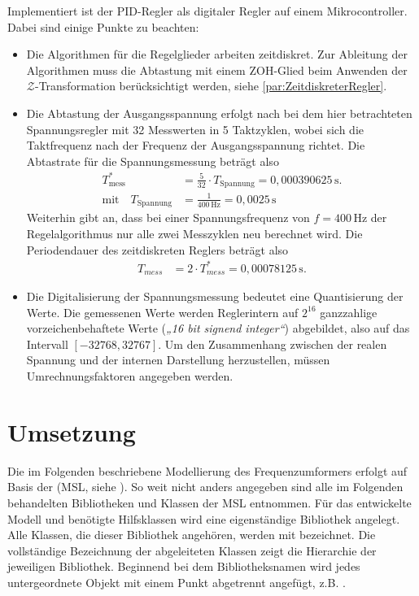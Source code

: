 Implementiert ist der PID-Regler als digitaler Regler auf einem Mikrocontroller. Dabei sind einige Punkte zu beachten:
\begin{itemize}
    \item {Die Algorithmen für die Regelglieder arbeiten zeitdiskret. Zur Ableitung der Algorithmen muss die Abtastung mit einem ZOH-Glied beim Anwenden der $\mathcal{Z}$-Transformation berücksichtigt werden, siehe \cref{par:ZeitdiskreterRegler}.}
    \item {Die Abtastung der Ausgangsspannung erfolgt nach \cite{pillerpowerssystemsDigitalerSpannungsreglerSoftwaredokumentation1997} bei dem hier betrachteten Spannungsregler mit 32 Messwerten in 5 Taktzyklen, wobei sich die Taktfrequenz nach der Frequenz der Ausgangsspannung richtet. Die Abtastrate für die Spannungsmessung beträgt also
    \begin{align}
        T_{\mathrm{mess}}^*&= \frac{5}{32}\cdot T_{\mathrm{Spannung}} = 0,000390625\,\mathrm s. \\
        \text{mit} \quad
        T_{\mathrm{Spannung}}&= \frac{1}{400\,\mathrm{Hz}}=0,0025\,\mathrm s
    \end{align}
    Weiterhin gibt \cite{pillerpowerssystemsDigitalerSpannungsreglerSoftwaredokumentation1997} an, dass bei einer Spannungsfrequenz von \(f=400\,\mathrm{Hz}\) der Regelalgorithmus nur alle zwei Messzyklen neu berechnet wird. Die Periodendauer des zeitdiskreten Reglers beträgt also
    \begin{align}
        T_{mess}&=2\cdot T_{mess}^*= 0,00078125\,\mathrm s.
    \end{align} }
    \item {Die Digitalisierung der Spannungsmessung bedeutet eine Quantisierung der Werte. Die gemessenen Werte werden Reglerintern auf \(2^{16}\) ganzzahlige vorzeichenbehaftete Werte (\emph{„16 bit signend integer“}) abgebildet, also auf das Intervall \([-32768,32767]\). Um den Zusammenhang zwischen der realen Spannung und der internen Darstellung herzustellen, müssen Umrechnungsfaktoren angegeben werden.}
\end{itemize}


\section{Umsetzung}\label{sec:umsetzung}

Die im Folgenden beschriebene Modellierung des Frequenzumformers erfolgt auf Basis der  (MSL, siehe \cite[]{modelicaassociationModelicaStandardLibrary2020}). So weit nicht anders angegeben sind alle im Folgenden behandelten Bibliotheken und Klassen der MSL entnommen. Für das entwickelte Modell und benötigte Hilfsklassen wird eine eigenständige Bibliothek  angelegt. Alle Klassen, die dieser Bibliothek angehören, werden mit  bezeichnet. Die vollständige Bezeichnung der abgeleiteten Klassen zeigt die Hierarchie der jeweiligen Bibliothek. Beginnend bei dem Bibliotheksnamen wird jedes untergeordnete Objekt mit einem Punkt abgetrennt angefügt, z.B. .

